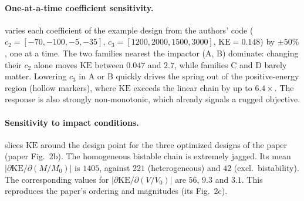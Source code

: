 \documentclass[12pt,letterpaper]{article}
\newcommand{\KE}{\mathrm{KE}}
\begin{document}
\begin{table}[H]
  \centering\small
  \caption{Verification of the Python DEM. Paper values are from Tamur
  \emph{et al.}~\cite{tamur} (SI Tables S1--S2 and Sec.~3).}
  \label{tab:validation}
\end{table}

\paragraph{One-at-a-time coefficient sensitivity.}
 varies each coefficient of the example design from the authors' code
($c_2=[-70,-100,-5,-35]$, $c_3=[1200,2000,1500,3000]$, $\KE=0.148$) by $\pm50\%$,
one at a time. The two families nearest the impactor (A, B) dominate: changing their
$c_2$ alone moves $\KE$ between $0.047$ and $2.7$, while families C and D barely
matter. Lowering $c_3$ in A or B quickly drives the spring out of the
positive-energy region (hollow markers), where $\KE$ exceeds the linear chain by up to
$6.4\times$. The response is also strongly non-monotonic, which already signals a
rugged objective.

\paragraph{Sensitivity to impact conditions.}
 slices $\KE$ around the design point for the three optimized designs
of the paper (paper Fig.~2b). The homogeneous bistable chain is extremely jagged. Its
mean $|\partial\KE/\partial(M/M_0)|$ is $1405$, against $221$ (heterogeneous) and $42$
(excl.\ bistability). The corresponding values for $|\partial\KE/\partial(V/V_0)|$ are
$56$, $9.3$ and $3.1$. This reproduces the paper's ordering and magnitudes (its
Fig.~2c).
\end{document}
